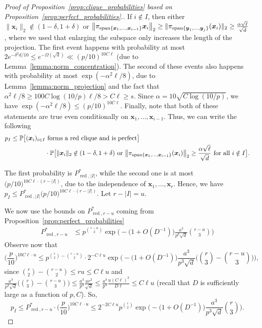 \documentclass[11pt]{amsart}
\theoremstyle{definition}
\def\Pb{\mathbb{P}}
\def\bx{\boldsymbol{x}}
\def\by{\boldsymbol{y}}
\DeclareMathOperator{\red}{red}
\begin{document}
\begin{proof}[Proof of Proposition~\ref{prop:clique_probabilities} based on Proposition~\ref{prop:perfect_probabilities}.]
If $i\notin I$, then either $\|\bx_i\|_2\notin (1-\delta, 1+\delta)$ or $\big\|\pi_{{\rm span}\{\bx_1, \dots, \bx_{i-1}\}}\bx_i\big\|_2\geq \|\pi_{{\rm span}\{\by_1, \dots, \by_j\}} (\bx_i)\|_2
\geq \frac{\alpha\sqrt{\ell}}{\sqrt{d}}$, where we used that enlarging the subspace only increases the length of the projection. The first event happens with probability at most $2e^{-\delta^2d/10}\leq e^{-\Omega(\sqrt{d})}\ll (p/10)^{10C\ell}$ (due to Lemma~\ref{lemma:norm_concentration}). The second of these events also happens with probability at most $\exp(-\alpha^2\ell/8)$, due to Lemma~\ref{lemma:norm_projection} and the fact that $\alpha^2\ell/8\geq 100C\log (10/p)\ell/8>C\ell\geq s$. Since $\alpha=10\sqrt{C\log(10/p)}$, we have $\exp(-\alpha^2\ell/8)\leq (p/10)^{10C\ell}$. Finally, note that both of these statements are true even conditionally on $\bx_1, \dots, \bx_{i-1}$. Thus, we can write the following
{\smaller[0.3]
\begin{align*}
    p_I\leq \Pb\big[(\bx_i)_{i\in I}&\text{ forms a red clique and is perfect}\big]\\
    &\cdot \Pb\big[\|\bx_i\|_2\notin(1-\delta, 1+\delta)\text{ or }\big\|\pi_{{\rm span}\{\bx_1, \dots, \bx_{i-1}\}}(\bx_i)\big\|_2\geq \frac{\alpha\sqrt{\ell}}{\sqrt{d}}\text{ for all }i\notin I\big].
\end{align*}
}

The first probability is $P_{\red, |I|}^*$, while the second one is at most $\big(p/10\big)^{10C\ell\cdot (r-|I|)}$, due to the independence of $\bx_1, \dots, \bx_r$. Hence, we have
$p_I\leq P_{\red, |I|}^*\big(p/10\big)^{10 C\ell\cdot (r-|I|)}$. Let $r-|I|=u$.

We now use the bounds on $P_{\red, r-u}^*$ coming from Proposition~\ref{prop:perfect_probabilities}
{\smaller[0.3]
\begin{align*}
  P_{\red, r-u}^*&\leq p^{\binom{r-u}{2}}\exp\bigg(-\big(1+O(D^{-1})\big)\frac{a^3}{p^3\sqrt{d}}\binom{r-u}{3}\bigg)
\end{align*}
}
Observe now that
{\smaller[0.3]
\[\Big(\frac{p}{10}\Big)^{10 C\ell\cdot u}\leq p^{\binom{r}{2}-\binom{r-u}{2}}\cdot 2^{-C\ell u}\exp\bigg(-\big(1+O(D^{-1})\big) \frac{a^3}{p^3 \sqrt{d}}\Big(\binom{r}{3}-\binom{r-u}{3}\Big)\bigg),\]
}
since $\binom{r}{2}-\binom{r-u}{2}\leq ru\leq C\ell u$ and $\frac{a^3}{p^3\sqrt{d}}\Big(\binom{r}{3}-\binom{r-u}{3}\Big)\leq \frac{a^3}{p^3}\frac{ur^2}{\sqrt{d}}\leq \frac{a^3}{p^3}\frac{u(C\ell)^2}{D\ell}\leq C\ell u$ (recall that $D$ is sufficiently large as a function of $p, C$).
So,
{\smaller[0.3]
\[p_I\leq P_{\red, r-u}^*\cdot \Big(\frac{p}{10}\Big)^{10 C\ell\cdot u}\leq 2^{-2C\ell u} p^{\binom{r}{2}}\exp\bigg(-\big(1+O(D^{-1})\big)\frac{a^3}{p^3\sqrt{d}}\binom{r}{3}\bigg).\]
}


\end{proof}
\end{document}
